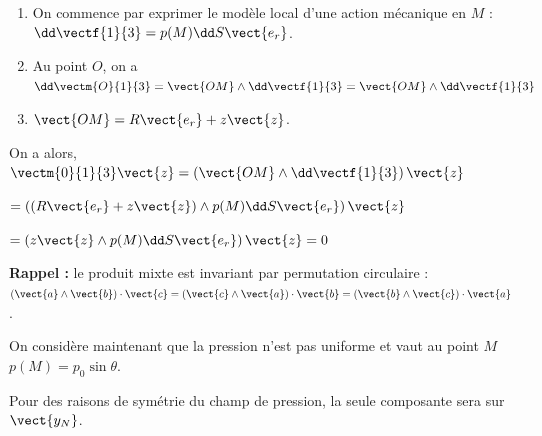 \ifprof
\begin{corrige}
\begin{enumerate}
\item On commence par exprimer le modèle local d'une action mécanique en $M$ : $\dd \vectf{1}{3} = p(M) \dd S \vect{e_r}$.
\item Au point $O$, on a $\dd \vectm{O}{1}{3}=\vect{OM}\wedge \dd \vectf{1}{3} =\vect{OM}\wedge \dd \vectf{1}{3} $
\item $\vect{OM}=R\vect{e_r}+z\vect{z}$.
\end{enumerate}
On a alors, $ \vectm{0}{1}{3}\vect{z} =\left( \vect{OM}\wedge \dd \vectf{1}{3}\right) \vect{z}$

$ = \left( \left( R\vect{e_r}+z\vect{z} \right) \wedge  p(M) \dd S \vect{e_r}\right) \vect{z}$

$ = \left(z\vect{z} \wedge  p(M) \dd S \vect{e_r}\right) \vect{z} = 0$


\textbf{Rappel :} le produit mixte est invariant par permutation circulaire : $\left( \vect{a}\wedge \vect{b}\right)\cdot \vect{c} = \left( \vect{c}\wedge \vect{a}\right)\cdot \vect{b} = \left( \vect{b}\wedge \vect{c}\right)\cdot \vect{a}$.
\end{corrige}
\else
\fi

\vspace{.5cm}

On considère maintenant que la pression n'est pas uniforme et vaut au point $M$ $p(M)=p_0\sin\theta$.

\ifprof
\begin{corrige}
Pour des raisons de symétrie du champ de pression, la seule composante sera sur $\vect{y_N}$.
\end{corrige}
\else
\fi


